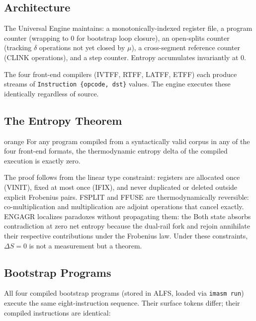 \documentclass[12pt,a4paper]{article}
\begin{document}
\subsection{Architecture}

The Universal Engine maintains: a monotonically-indexed register file, a program counter (wrapping to 0 for bootstrap loop closure), an open-splits counter (tracking $\delta$ operations not yet closed by $\mu$), a cross-segment reference counter (CLINK operations), and a step counter. Entropy accumulates invariantly at 0.

The four front-end compilers (IVTFF, RTFF, LATFF, ETFF) each produce streams of \texttt{Instruction \{opcode, dst\}} values. The engine executes these identically regardless of source.

\subsection{The Entropy Theorem}

\begin{admonitionbox}[Theorem: \ensuremath{\Delta S = 0}]{orange}
For any program compiled from a syntactically valid corpus in any of the four front-end formats, the thermodynamic entropy delta of the compiled execution is exactly zero.
\end{admonitionbox}

The proof follows from the linear type constraint: registers are allocated once (VINIT), fixed at most once (IFIX), and never duplicated or deleted outside explicit Frobenius pairs. FSPLIT and FFUSE are thermodynamically reversible: co-multiplication and multiplication are adjoint operations that cancel exactly. ENGAGR localizes paradoxes without propagating them: the Both state absorbs contradiction at zero net entropy because the dual-rail fork and rejoin annihilate their respective contributions under the Frobenius law. Under these constraints, $\Delta S = 0$ is not a measurement but a theorem.

\subsection{Bootstrap Programs}

All four compiled bootstrap programs (stored in ALFS, loaded via \texttt{imasm run}) execute the same eight-instruction sequence. Their surface tokens differ; their compiled instructions are identical:
\end{document}
